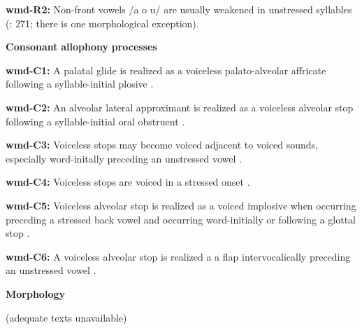 \begin{styleBody}
\textbf{wmd-R2:} Non-front vowels /a o u/ are usually weakened in unstressed syllables (\citealt{Eberhard2009}: 271; there is one morphological exception).
\end{styleBody}

\begin{styleBody}
\textbf{Consonant} \textbf{allophony} \textbf{processes}
\end{styleBody}

\begin{styleBody}
\textbf{wmd-C1:} A palatal glide is realized as a voiceless palato-alveolar affricate following a syllable-initial plosive \citep[94]{Eberhard2009}.
\end{styleBody}

\begin{styleBody}
\textbf{wmd-C2:} An alveolar lateral approximant is realized as a voiceless alveolar stop following a syllable-initial oral obstruent \citep[92]{Eberhard2009}.
\end{styleBody}

\begin{styleBody}
\textbf{wmd-C3:} Voiceless stops may become voiced adjacent to voiced sounds, especially word-initally preceding an unstressed vowel \citep{Eberhard2009}.
\end{styleBody}

\begin{styleBody}
\textbf{wmd-C4:} Voiceless stops are voiced in a stressed onset \citep[55]{Eberhard2009}.
\end{styleBody}

\begin{styleBody}
\textbf{wmd-C5:} Voiceless alveolar stop is realized as a voiced implosive when occurring preceding a stressed back vowel and occurring word-initially or following a glottal stop \citep[58]{Eberhard2009}.
\end{styleBody}

\begin{styleBody}
\textbf{wmd-C6:} A voiceless alveolar stop is realized a a flap intervocalically preceding an unstressed vowel \citep[55]{Eberhard2009}.
\end{styleBody}

\begin{styleBody}
\textbf{Morphology}
\end{styleBody}

\begin{styleBody}
(adequate texts unavailable)
\end{styleBody}

